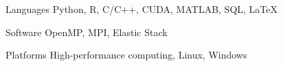 

\begin{cvskills}

  \cvskill
    {Languages} %
    {Python, R, C/C++, CUDA, MATLAB, SQL, LaTeX} %

  \cvskill
    {Software} %
    {OpenMP, MPI, Elastic Stack} %

  \cvskill
    {Platforms} %
    {High-performance computing, Linux, Windows} %


\end{cvskills}
